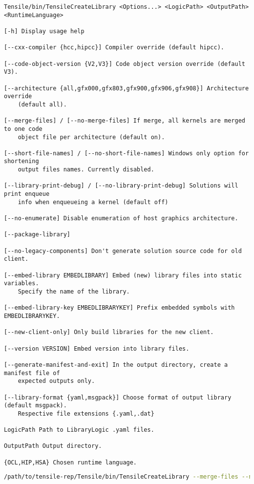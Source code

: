 \documentclass[]{article}
\begin{document}
\begin{verbatim}
Tensile/bin/TensileCreateLibrary <Options...> <LogicPath> <OutputPath> <RuntimeLanguage>

[-h] Display usage help

[--cxx-compiler {hcc,hipcc}] Compiler override (default hipcc).

[--code-object-version {V2,V3}] Code object version override (default V3).

[--architecture {all,gfx000,gfx803,gfx900,gfx906,gfx908}] Architecture override 
    (default all).

[--merge-files] / [--no-merge-files] If merge, all kernels are merged to one code 
    object file per architecture (default on).

[--short-file-names] / [--no-short-file-names] Windows only option for shortening 
    output files names. Currently disabled.

[--library-print-debug] / [--no-library-print-debug] Solutions will print enqueue 
    info when enqueueing a kernel (default off)

[--no-enumerate] Disable enumeration of host graphics architecture.

[--package-library]

[--no-legacy-components] Don't generate solution source code for old client.

[--embed-library EMBEDLIBRARY] Embed (new) library files into static variables. 
    Specify the name of the library.

[--embed-library-key EMBEDLIBRARYKEY] Prefix embedded symbols with EMBEDLIBRARYKEY.

[--new-client-only] Only build libraries for the new client.

[--version VERSION] Embed version into library files.

[--generate-manifest-and-exit] In the output directory, create a manifest file of 
    expected outputs only.

[--library-format {yaml,msgpack}] Choose format of output library (default msgpack). 
    Respective file extensions {.yaml,.dat}

LogicPath Path to LibraryLogic .yaml files.

OutputPath Output directory.

{OCL,HIP,HSA} Chosen runtime language.
\end{verbatim}

\begin{lstlisting}[language=bash]
/path/to/tensile-rep/Tensile/bin/TensileCreateLibrary --merge-files --no-legacy-components --no-short-file-names --no-library-print-debug --code-object-version=V3 --cxx-compiler=hipcc --library-format=msgpack path/to/new/logic path/to/drop/new/tensile HIP
\end{lstlisting}
\end{document}

